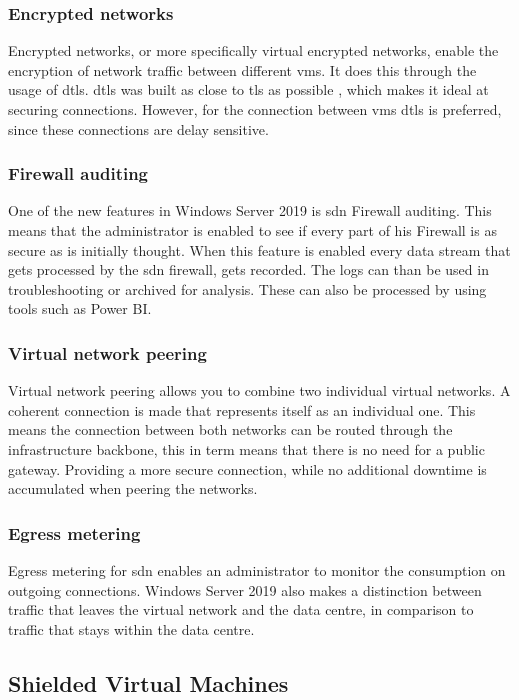 \subsubsection{Encrypted networks}
Encrypted networks, or more specifically virtual encrypted networks, enable the encryption of network traffic between different \acrlong{vm}s. It does this through the usage of \acrfull{dtls}. \acrshort{dtls} was built as close to \acrshort{tls} as possible \autocite{Modadugu2004}, which makes it ideal at securing connections. However, for the connection between \acrlong{vm}s \acrshort{dtls} is preferred, since these connections are delay sensitive. 

\subsubsection{Firewall auditing}
One of the new features in Windows Server 2019 is \acrshort{sdn} Firewall auditing. This means that the administrator is enabled to see if every part of his Firewall is as secure as is initially thought. When this feature is enabled every data stream that gets processed by the \acrshort{sdn} firewall, gets recorded. The logs can than be used in troubleshooting or archived for analysis. These can also be processed by using tools such as Power BI.

\subsubsection{Virtual network peering}
Virtual network peering allows you to combine two individual virtual networks. A coherent connection is made that represents itself as an individual one. This means the connection between both networks can be routed through the infrastructure backbone, this in term means that there is no need for a public gateway. Providing a more secure connection, while no additional downtime is accumulated when peering the networks.

\subsubsection{Egress metering}
Egress metering for \acrshort{sdn} enables an administrator to monitor the consumption on outgoing connections. Windows Server 2019 also makes a distinction between traffic that leaves the virtual network and the data centre, in comparison to traffic that stays within the data centre. 

\subsection{Shielded Virtual Machines}

